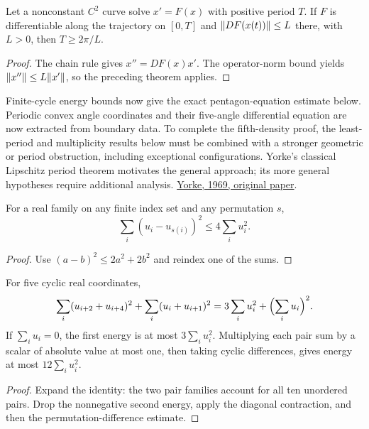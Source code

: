\begin{proposition}
\label{prop:ode-period-bound}
\leanok
{}
Let a nonconstant $C^2$ curve solve $x'=F(x)$ with positive period $T$.
If $F$ is differentiable along the trajectory on $[0,T]$ and
$\lVert DF(x(t))\rVert\leq L$ there, with $L>0$, then $T\geq2\pi/L$.
\end{proposition}
\begin{proof}
\leanok
The chain rule gives $x''=DF(x)x'$. The operator-norm bound yields
$\lVert x''\rVert\leq L\lVert x'\rVert$, so the preceding theorem applies.
\end{proof}

Finite-cycle energy bounds now give the exact pentagon-equation estimate
below. Periodic convex angle coordinates and their five-angle differential
equation are now extracted from boundary data. To complete the fifth-density
proof, the least-period and multiplicity results below must be combined with
a stronger geometric or period obstruction, including exceptional
configurations. Yorke's classical Lipschitz period theorem motivates the
general approach; its more general hypotheses require additional analysis.
\href{https://msekce.karlin.mff.cuni.cz/~prazak/uceni/Odr2/Cviceni/Yorke-period.pdf}{Yorke, 1969, original paper}.

\begin{lemma}
\label{lem:cycle-difference-energy}
\leanok
For a real family on any finite index set and any permutation $s$,
\[
 \sum_i(u_i-u_{s(i)})^2\leq4\sum_i u_i^2.
\]
\end{lemma}
\begin{proof}
\leanok
Use $(a-b)^2\leq2a^2+2b^2$ and reindex one of the sums.
\end{proof}

\begin{lemma}
\label{lem:pentagon-pair-energy}
\leanok
{}
For five cyclic real coordinates,
\[
 \sum_i(u_{i+2}+u_{i+4})^2+\sum_i(u_i+u_{i+1})^2
 =3\sum_i u_i^2+\Bigl(\sum_i u_i\Bigr)^2.
\]
If $\sum_i u_i=0$, the first energy is at most $3\sum_i u_i^2$.
Multiplying each pair sum by a scalar of absolute value at most one,
then taking cyclic differences, gives energy at most $12\sum_i u_i^2$.
\end{lemma}
\begin{proof}
\leanok
Expand the identity: the two pair families account for all ten unordered
pairs. Drop the nonnegative second energy, apply the diagonal contraction,
and then the permutation-difference estimate.
\end{proof}

